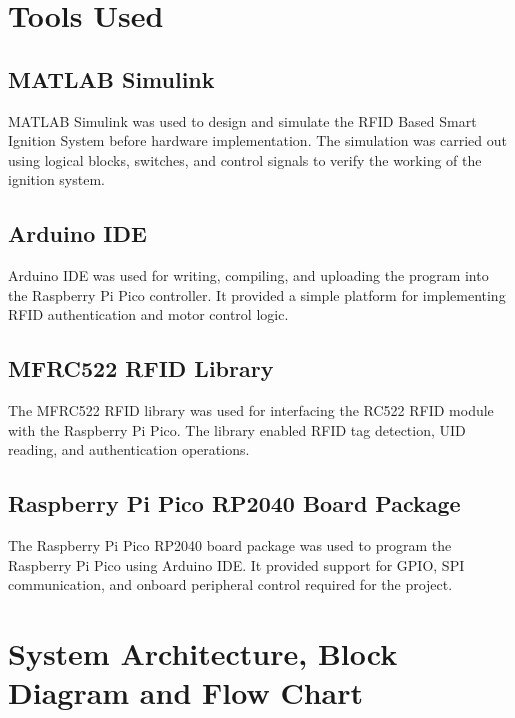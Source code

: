 \documentclass[12pt,a4paper,oneside]{report}
\begin{document}

\chapter{Tools Used}

\section{MATLAB Simulink}

MATLAB Simulink was used to design and simulate the RFID Based Smart Ignition System before hardware implementation. The simulation was carried out using logical blocks, switches, and control signals to verify the working of the ignition system. 

\section{Arduino IDE}

Arduino IDE was used for writing, compiling, and uploading the program into the Raspberry Pi Pico controller. It provided a simple platform for implementing RFID authentication and motor control logic.

\section{MFRC522 RFID Library}

The MFRC522 RFID library was used for interfacing the RC522 RFID module with the Raspberry Pi Pico. The library enabled RFID tag detection, UID reading, and authentication operations.

\section{Raspberry Pi Pico RP2040 Board Package}

The Raspberry Pi Pico RP2040 board package was used to program the Raspberry Pi Pico using Arduino IDE. It provided support for GPIO, SPI communication, and onboard peripheral control required for the project.


\chapter{System Architecture, Block Diagram and Flow Chart}
\end{document}
